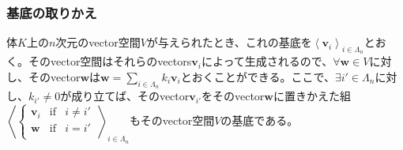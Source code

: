 \documentclass[dvipdfmx]{jsarticle}
\begin{document}
\subsubsection{基底の取りかえ}%
\begin{thm}\label{2.1.1.23}
体$K$上の$n$次元のvector空間$V$が与えられたとき、これの基底を$\left\langle \mathbf{v}_{i} \right\rangle_{i \in \varLambda_{n}}$とおく。そのvector空間はそれらのvectors$\mathbf{v}_{i}$によって生成されるので、$\forall\mathbf{w} \in V$に対し、そのvector$\mathbf{w}$は$\mathbf{w} = \sum_{i \in \varLambda_{n}} {k_{i}\mathbf{v}_{i}}$とおくことができる。ここで、$\exists i' \in \varLambda_{n}$に対し、$k_{i'} \neq 0$が成り立てば、そのvector$\mathbf{v}_{i'}$をそのvector$\mathbf{w}$に置きかえた組$\left\langle \left\{ \begin{matrix}
\mathbf{v}_{i} & \mathrm{if}  & i \neq i' \\
\mathbf{w} & \mathrm{if}  & i = i' \\
\end{matrix} \right.\  \right\rangle_{i \in \varLambda_{n}}$もそのvector空間$V$の基底である。
\end{thm}
\end{document}
